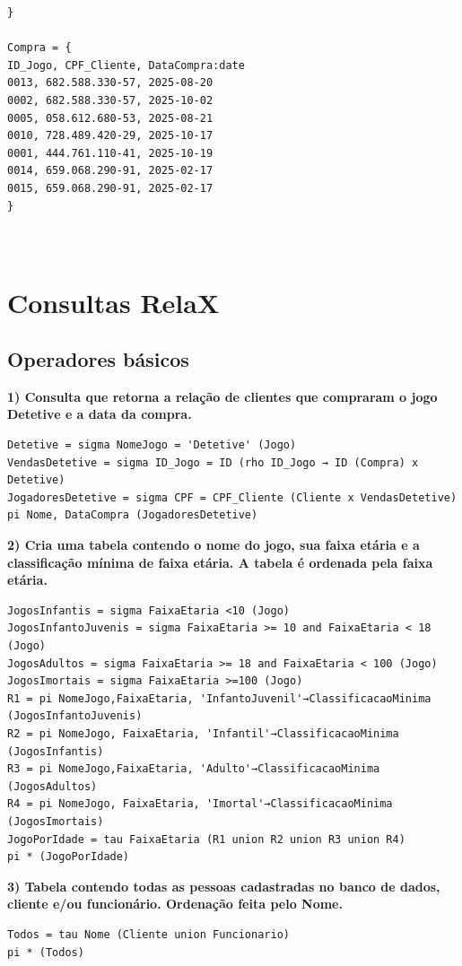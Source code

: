 \documentclass[11pt]{article}
\begin{document}
\begin{Verbatim}[breaklines=true, breakanywhere=true]
}

Compra = {
ID_Jogo, CPF_Cliente, DataCompra:date
0013, 682.588.330-57, 2025-08-20
0002, 682.588.330-57, 2025-10-02
0005, 058.612.680-53, 2025-08-21
0010, 728.489.420-29, 2025-10-17
0001, 444.761.110-41, 2025-10-19
0014, 659.068.290-91, 2025-02-17
0015, 659.068.290-91, 2025-02-17
}

    
\end{Verbatim}

\section{Consultas RelaX}
\subsection{Operadores básicos}
\textbf{1) Consulta que retorna a relação de clientes que compraram o jogo Detetive e a data da compra.}
\begin{Verbatim}[breaklines=true, breakanywhere=true]
Detetive = sigma NomeJogo = 'Detetive' (Jogo)
VendasDetetive = sigma ID_Jogo = ID (rho ID_Jogo → ID (Compra) x Detetive)
JogadoresDetetive = sigma CPF = CPF_Cliente (Cliente x VendasDetetive)
pi Nome, DataCompra (JogadoresDetetive)
\end{Verbatim}
\textbf{2) Cria uma tabela contendo o nome do jogo, sua faixa etária e a classificação mínima de faixa etária. A tabela é ordenada pela faixa etária.}
\begin{Verbatim}[breaklines=true, breakanywhere=true]
JogosInfantis = sigma FaixaEtaria <10 (Jogo)
JogosInfantoJuvenis = sigma FaixaEtaria >= 10 and FaixaEtaria < 18 (Jogo)
JogosAdultos = sigma FaixaEtaria >= 18 and FaixaEtaria < 100 (Jogo)
JogosImortais = sigma FaixaEtaria >=100 (Jogo)
R1 = pi NomeJogo,FaixaEtaria, 'InfantoJuvenil'→ClassificacaoMinima (JogosInfantoJuvenis)
R2 = pi NomeJogo, FaixaEtaria, 'Infantil'→ClassificacaoMinima (JogosInfantis)
R3 = pi NomeJogo,FaixaEtaria, 'Adulto'→ClassificacaoMinima (JogosAdultos)
R4 = pi NomeJogo, FaixaEtaria, 'Imortal'→ClassificacaoMinima (JogosImortais)
JogoPorIdade = tau FaixaEtaria (R1 union R2 union R3 union R4)
pi * (JogoPorIdade)
\end{Verbatim}
\textbf{3) Tabela contendo todas as pessoas cadastradas no banco de dados, cliente e/ou funcionário. Ordenação feita pelo Nome.}
\begin{Verbatim}[breaklines=true, breakanywhere=true]
Todos = tau Nome (Cliente union Funcionario)
pi * (Todos)
\end{Verbatim}
\end{document}
